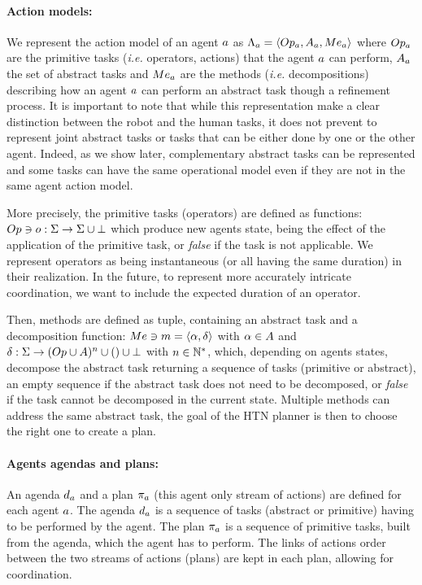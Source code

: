 \documentclass[a4paper,11pt,twoside]{StyleThese}
\begin{document}
\paragraph{\bf Action models:}
We represent the action model of an agent $a$ as $\Lambda_{a} = \langle Op_{a}, A_{a}, Me_{a} \rangle$ where $Op_{a}$ are the primitive tasks (\textit{i.e.} operators, actions) that the agent $a$ can perform, $A_{a}$ the set of abstract tasks and $Me_{a}$ are the methods (\textit{i.e.} decompositions) describing how an agent $a$ can perform an abstract task though a refinement process. It is important to note that while this representation make a clear distinction between the robot and the human tasks, it does not prevent to represent joint abstract tasks or tasks that can be either done by one or the other agent. Indeed, as we show later, complementary abstract tasks can be represented and some tasks can have the same operational model even if they are not in the same agent action model. 

More precisely, the primitive tasks (operators) are defined as functions: $Op \ni o: \Sigma \rightarrow \Sigma \cup \bot$ which produce new agents state, being the effect of the application of the primitive task, or \textit{false} if the task is not applicable. We represent operators as being instantaneous (or all having the same duration) in their realization. In the future, to represent more accurately intricate coordination, we want to include the expected duration of an operator.

Then, methods are defined as tuple, containing an abstract task and a decomposition function: $Me \ni m = \langle \alpha, \delta \rangle$ with $\alpha \in A$ and $\delta: \Sigma \rightarrow (Op \cup A)^n \cup () \cup \bot$ with $n \in \mathbb{N}^*$, which, depending on agents states, decompose the abstract task returning a sequence of tasks (primitive or abstract), an empty sequence if the abstract task does not need to be decomposed, or \textit{false} if the task cannot be decomposed in the current state. Multiple methods can address the same abstract task, the goal of the HTN planner is then to choose the right one to create a plan.

\paragraph{\bf Agents agendas and plans:}
An agenda $d_{a}$ and a plan $\pi_{a}$ (this agent only stream of actions) are defined for each agent $a$. The agenda $d_{a}$ is a sequence of tasks (abstract or primitive) having to be performed by the agent. The plan $\pi_{a}$ is a sequence of primitive tasks, built from the agenda, which the agent has to perform. The links of actions order between the two streams of actions (plans) are kept in each plan, allowing for coordination.
\end{document}
